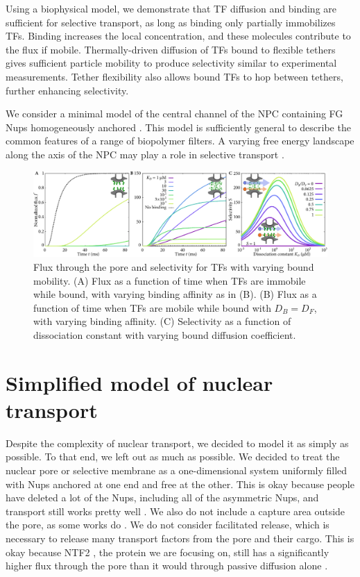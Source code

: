 Using a biophysical model, we demonstrate that TF diffusion and
binding are sufficient for selective transport, as long as binding
only partially immobilizes TFs. Binding increases the local
concentration, and these molecules contribute to the flux if mobile.
Thermally-driven diffusion of TFs bound to flexible tethers gives
sufficient particle mobility to produce selectivity similar to
experimental measurements.  Tether flexibility also allows bound TFs
to hop between tethers, further enhancing selectivity.

We consider a minimal model of the central channel of the NPC
containing FG Nups homogeneously anchored .  This
model is sufficiently general to describe the common features of a
range of biopolymer filters.   A varying free energy landscape
along the axis of the NPC may play a role in selective transport
\cite{zilman07, tagliazucchi13, tu13, timney16}. 

\begin{figure}[t!]
\centering
\includegraphics[width=\textwidth]{figs/ch02/fig2.pdf}
\caption{Flux through the pore and selectivity for TFs with varying
  bound mobility. (A) Flux as a function of time when TFs are immobile
  while bound, with varying binding affinity as in (B).  (B) Flux as a function
  of time when TFs are mobile while bound with $D_B = D_F$, with
  varying binding affinity.  (C) Selectivity as a function of
  dissociation constant with varying bound diffusion coefficient. }
\label{fig:transient}
\end{figure}


\section{Simplified model of nuclear transport}

Despite the complexity of nuclear transport, we decided to model it as simply as possible.  To that end, we left out as much as possible.  We decided to treat the nuclear pore or selective membrane as a one-dimensional system uniformly filled with Nups anchored at one end and free at the other.  This is okay because people have deleted a lot of the Nups, including all of the asymmetric Nups, and transport still works pretty well \cite{strawn04, zeitler04,kowalczyk11, jovanovic-talisman09}.  We also do not include a capture area outside the pore, as some works do \cite{pagliara14}.  We do not consider facilitated release, which is necessary to release many transport factors from the pore and their cargo\cite{lowe15, mincer11, gorlich96, gilchrist02}.  This is okay because NTF2 \cite{ribbeck98}, the protein we are focusing on, still has a significantly higher flux through the pore than it would through passive diffusion alone \cite{mincer11, zilman07}. 

